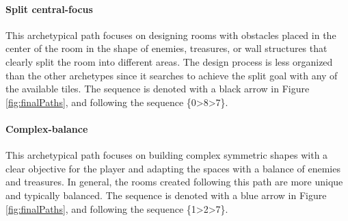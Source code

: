 \paragraph{Split central-focus}This archetypical path focuses on designing rooms with obstacles placed in the center of the room in the shape of enemies, treasures, or wall structures that clearly split the room into different areas. The design process is less organized than the other archetypes since it searches to achieve the split goal with any of the available tiles. The sequence is denoted with a black arrow in Figure \ref{fig:finalPaths}, and following the sequence \{0\textgreater8\textgreater7\}.

\paragraph{Complex-balance}This archetypical path focuses on building complex symmetric shapes with a clear objective for the player and adapting the spaces with a balance of enemies and treasures. In general, the rooms created following this path are more unique and typically balanced. %
The sequence is denoted with a blue arrow in Figure \ref{fig:finalPaths}, and following the sequence \{1\textgreater2\textgreater7\}.


